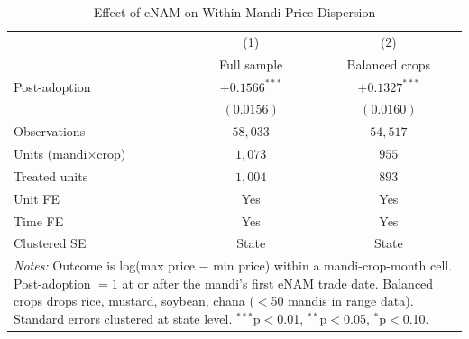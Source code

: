 \begin{table}[htbp]
\centering
\caption{Effect of eNAM on Within-Mandi Price Dispersion}
\label{tab:within_mandi_main}
\begin{tabular}{lcc}
\hline\hline
 & (1) & (2) \\
 & Full sample & Balanced crops \\
\hline
Post-adoption & $+0.1566^{***}$ & $+0.1327^{***}$ \\
 & $(0.0156)$ & $(0.0160)$ \\
\hline
Observations & $58,033$ & $54,517$ \\
Units (mandi$\times$crop) & $1,073$ & $955$ \\
Treated units & $1,004$ & $893$ \\
Unit FE & Yes & Yes \\
Time FE & Yes & Yes \\
Clustered SE & State & State \\
\hline\hline
\multicolumn{3}{l}{\footnotesize \textit{Notes:} Outcome is log(max price $-$ min price) within a mandi-crop-month cell. Post-adoption $= 1$ at or after the mandi's first eNAM trade date. Balanced crops drops rice, mustard, soybean, chana ($<$50 mandis in range data). Standard errors clustered at state level. $^{{***}}$p$<$0.01, $^{{**}}$p$<$0.05, $^{{*}}$p$<$0.10.}} \\
\end{tabular}
\end{table}